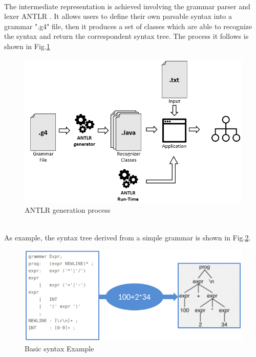 \paragraph{} The intermediate representation is achieved involving the grammar parser and lexer ANTLR \citep{antlr}. It allows users to define their own parsable syntax into a  grammar ".g4" file, then it produces a set of classes which are able to recognize the syntax and return the correspondent syntax tree. The process it follows is shown in Fig.\ref{fig:antlrp}

\begin{figure}[!h]
\centering
\includegraphics[width=.7\textwidth]{Figs/antlrprocess.PNG}
\caption{ANTLR generation process}
\label{fig:antlrp}
\end{figure}
\noindent
\\
As example, the syntax tree derived from a simple grammar is shown in Fig.\ref{fig:antlrtree}.
\begin{figure}[!h]
\centering
\includegraphics[width=.65\textwidth]{Figs/antlrtree.PNG}
\caption{Basic syntax Example}
\label{fig:antlrtree}
\end{figure}

